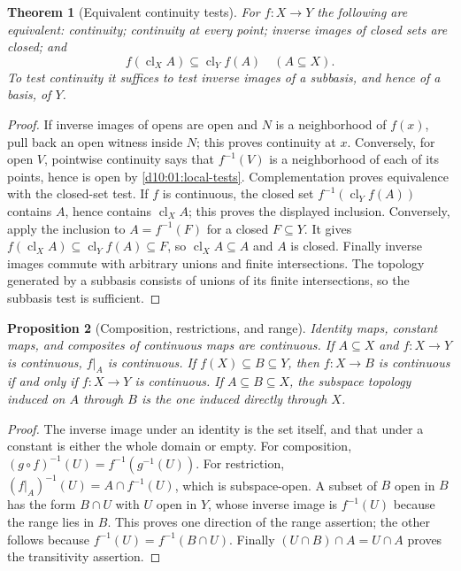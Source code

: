 \documentclass[11pt,oneside,openany]{book}
\newtheorem{theorem}{Theorem}[chapter]
\newtheorem{proposition}[theorem]{Proposition}
\theoremstyle{definition}
\theoremstyle{remark}
\DeclareMathOperator{\cl}{cl}
\begin{document}
\begin{theorem}[Equivalent continuity tests]\label{d10:02:continuity-tests}
For $f:X\to Y$ the following are equivalent: continuity; continuity at every point; inverse images of closed sets are closed; and
\[
 f(\cl_X A)\subseteq\cl_Y f(A)\quad(A\subseteq X).
\]
To test continuity it suffices to test inverse images of a subbasis, and hence of a basis, of $Y$.
\end{theorem}
\begin{proof}
If inverse images of opens are open and $N$ is a neighborhood of $f(x)$, pull back an open witness inside $N$; this proves continuity at $x$. Conversely, for open $V$, pointwise continuity says that $f^{-1}(V)$ is a neighborhood of each of its points, hence is open by \cref{d10:01:local-tests}. Complementation proves equivalence with the closed-set test. If $f$ is continuous, the closed set $f^{-1}(\cl_Y f(A))$ contains $A$, hence contains $\cl_X A$; this proves the displayed inclusion. Conversely, apply the inclusion to $A=f^{-1}(F)$ for a closed $F\subseteq Y$. It gives $f(\cl_X A)\subseteq\cl_Y f(A)\subseteq F$, so $\cl_X A\subseteq A$ and $A$ is closed. Finally inverse images commute with arbitrary unions and finite intersections. The topology generated by a subbasis consists of unions of its finite intersections, so the subbasis test is sufficient.
\end{proof}

\begin{proposition}[Composition, restrictions, and range]\label{d10:02:restriction}
Identity maps, constant maps, and composites of continuous maps are continuous. If $A\subseteq X$ and $f:X\to Y$ is continuous, $f|_A$ is continuous. If $f(X)\subseteq B\subseteq Y$, then $f:X\to B$ is continuous if and only if $f:X\to Y$ is continuous. If $A\subseteq B\subseteq X$, the subspace topology induced on $A$ through $B$ is the one induced directly through $X$.
\end{proposition}
\begin{proof}
The inverse image under an identity is the set itself, and that under a constant is either the whole domain or empty. For composition, $(g\circ f)^{-1}(U)=f^{-1}(g^{-1}(U))$. For restriction, $(f|_A)^{-1}(U)=A\cap f^{-1}(U)$, which is subspace-open. A subset of $B$ open in $B$ has the form $B\cap U$ with $U$ open in $Y$, whose inverse image is $f^{-1}(U)$ because the range lies in $B$. This proves one direction of the range assertion; the other follows because $f^{-1}(U)=f^{-1}(B\cap U)$. Finally $(U\cap B)\cap A=U\cap A$ proves the transitivity assertion.
\end{proof}
\end{document}
